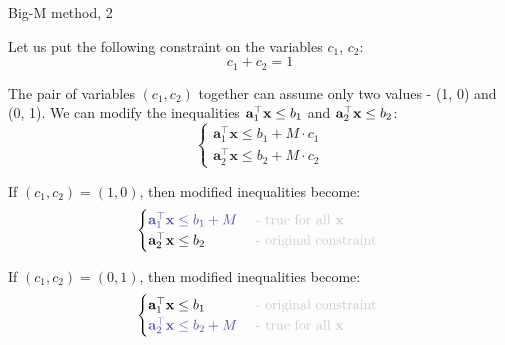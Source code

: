 \documentclass{beamer}
\begin{document}
\begin{frame}{Big-M method, 2}
	\begin{flushleft}
		
		Let us put the following constraint on the variables $c_1$, $c_2$:
		\begin{equation}
			c_1 + c_2 = 1
		\end{equation}
		
		The pair of variables $(c_1, c_2)$ together can assume only two values - (1, 0) and (0, 1). We can modify the inequalities $\mathbf{a}_1^\top \mathbf{x} \leq b_1$ and $\mathbf{a}_2^\top \mathbf{x} \leq b_2$:
		\begin{equation}
			\begin{cases}
				\mathbf{a}_1^\top \mathbf{x} \leq b_1 + M \cdot c_1 \\
				\mathbf{a}_2^\top \mathbf{x} \leq b_2 + M \cdot c_2
			\end{cases}
		\end{equation}
		
		If $(c_1, c_2) = (1, 0)$, then modified inequalities become:
		\begin{equation}
			\begin{cases}
				\textcolor{mydarkgray}{ \mathbf{a}_1\T \mathbf{x} \leq b_1 + M }  
				\ & \textcolor{mygray}{\text{- true for all }  \mathbf{x}}
				\\
				\mathbf{a}_2^\top \mathbf{x} \leq b_2 
				\ & \textcolor{mygray}{\text{- original constraint } }
			\end{cases}
		\end{equation}
		
		 
		 If $(c_1, c_2) = (0, 1)$, then modified inequalities become:
		 \begin{equation}
		 	\begin{cases}
		 		\mathbf{a}_1\T \mathbf{x} \leq b_1  
		 		\ & \textcolor{mygray}{\text{- original constraint } }
		 		\\
		 		\textcolor{mydarkgray}{\mathbf{a}_2^\top \mathbf{x} \leq b_2  + M}
		 		\ & \textcolor{mygray}{\text{- true for all }  \mathbf{x}}
		 	\end{cases}
		 \end{equation}
		
		
		
	\end{flushleft}
\end{frame}
\end{document}
